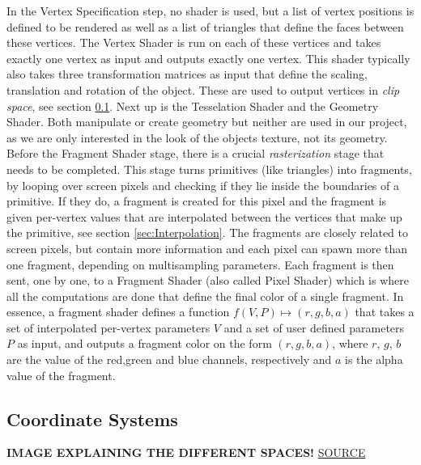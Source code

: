 In the Vertex Specification step, no shader is used, but a list of vertex positions is defined to be rendered as well as a list of triangles that define the faces between these vertices. The Vertex Shader is run on each of these vertices and takes exactly one vertex as input and outputs exactly one vertex. This shader typically also takes three transformation matrices as input that define the scaling, translation and rotation of the object. These are used to output vertices in \textit{clip space}, see section \ref{sec:CoordinateSystem}. Next up is the Tesselation Shader and the Geometry Shader. Both manipulate or create geometry but neither are used in our project, as we are only interested in the look of the objects texture, not its geometry. Before the Fragment Shader stage, there is a crucial \textit{rasterization} stage that needs to be completed. This stage turns primitives (like triangles) into fragments, by looping over screen pixels and checking if they lie inside the boundaries of a primitive. If they do, a fragment is created for this pixel and the fragment is given per-vertex values that are interpolated between the vertices that make up the primitive, see section \ref{sec:Interpolation}. The fragments are closely related to screen pixels, but contain more information and each pixel can spawn more than one fragment, depending on multisampling parameters. Each fragment is then sent, one by one, to a Fragment Shader (also called Pixel Shader) which is where all the computations are done that define the final color of a single fragment. In essence, a fragment shader defines a function $f(V,P) \mapsto (r,g,b,a)$ that takes a set of interpolated per-vertex parameters $V$ and a set of user defined parameters $P$ as input, and outputs a fragment color on the form $(r,g,b,a)$, where $r$, $g$, $b$ are the value of the red,green and blue channels, respectively and $a$ is the alpha value of the fragment.

\subsection{Coordinate Systems}\label{sec:CoordinateSystem}

\textbf{IMAGE EXPLAINING THE DIFFERENT SPACES!} \href{https://learnopengl.com/Getting-started/Coordinate-Systems}{SOURCE}

